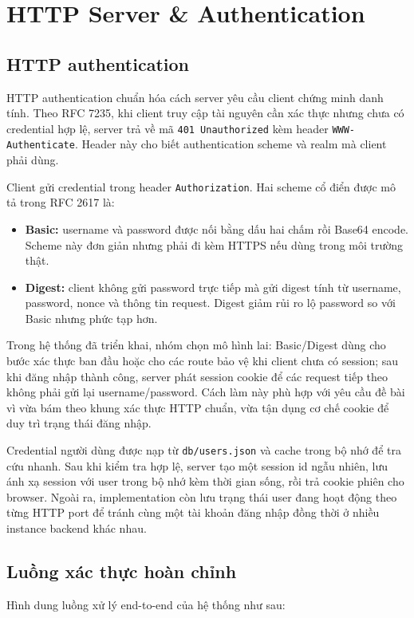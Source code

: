 \section{HTTP Server \& Authentication}
\subsection{HTTP authentication}
HTTP authentication chuẩn hóa cách server yêu cầu client chứng minh danh tính. Theo RFC 7235, khi client truy cập tài nguyên cần xác thực nhưng chưa có credential hợp lệ, server trả về mã \texttt{401 Unauthorized} kèm header \texttt{WWW-Authenticate}. Header này cho biết authentication scheme và realm mà client phải dùng.

Client gửi credential trong header \texttt{Authorization}. Hai scheme cổ điển được mô tả trong RFC 2617 là:
\begin{itemize}[leftmargin=2em]
    \item \textbf{Basic:} username và password được nối bằng dấu hai chấm rồi Base64 encode. Scheme này đơn giản nhưng phải đi kèm HTTPS nếu dùng trong môi trường thật.
    \item \textbf{Digest:} client không gửi password trực tiếp mà gửi digest tính từ username, password, nonce và thông tin request. Digest giảm rủi ro lộ password so với Basic nhưng phức tạp hơn.
\end{itemize}

Trong hệ thống đã triển khai, nhóm chọn mô hình lai: Basic/Digest dùng cho bước xác thực ban đầu hoặc cho các route bảo vệ khi client chưa có session; sau khi đăng nhập thành công, server phát session cookie để các request tiếp theo không phải gửi lại username/password. Cách làm này phù hợp với yêu cầu đề bài vì vừa bám theo khung xác thực HTTP chuẩn, vừa tận dụng cơ chế cookie để duy trì trạng thái đăng nhập.

Credential người dùng được nạp từ \texttt{db/users.json} và cache trong bộ nhớ để tra cứu nhanh. Sau khi kiểm tra hợp lệ, server tạo một session id ngẫu nhiên, lưu ánh xạ session với user trong bộ nhớ kèm thời gian sống, rồi trả cookie phiên cho browser. Ngoài ra, implementation còn lưu trạng thái user đang hoạt động theo từng HTTP port để tránh cùng một tài khoản đăng nhập đồng thời ở nhiều instance backend khác nhau.

\subsection{Luồng xác thực hoàn chỉnh}
Hình dung luồng xử lý end-to-end của hệ thống như sau:

